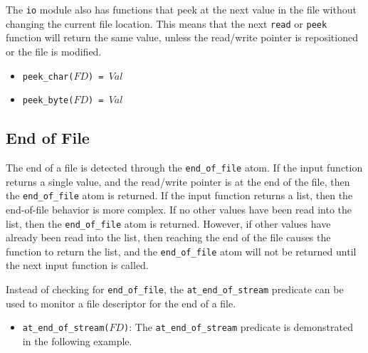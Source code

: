 The \texttt{io} module also has functions that peek at the next value in the file without changing the current file location.  This means that the next \texttt{read} or \texttt{peek} function will return the same value, unless the read/write pointer is repositioned or the file is modified.

\begin{itemize}
\item \texttt{peek\_char($FD$) = $Val$}
\item \texttt{peek\_byte($FD$) = $Val$}
\end{itemize}

\subsection{End of File}
The end of a file is detected through the \texttt{end\_of\_file} atom.  If the input function returns a single value, and the read/write pointer is at the end of the file, then the \texttt{end\_of\_file} atom is returned.  If the input function returns a list, then the end-of-file behavior is more complex.   If no other values have been read into the list, then the \texttt{end\_of\_file} atom is returned.  However, if other values have already been read into the list, then reaching the end of the file causes the function to return the list, and the \texttt{end\_of\_file} atom will not be returned until the next input function is called.

Instead of checking for \texttt{end\_of\_file}, the \texttt{at\_end\_of\_stream} predicate can be used to monitor a file descriptor for the end of a file.

\begin{itemize}
\item \texttt{at\_end\_of\_stream($FD$)}: The \texttt{at\_end\_of\_stream} predicate is demonstrated in the following example. 
\end{itemize}

